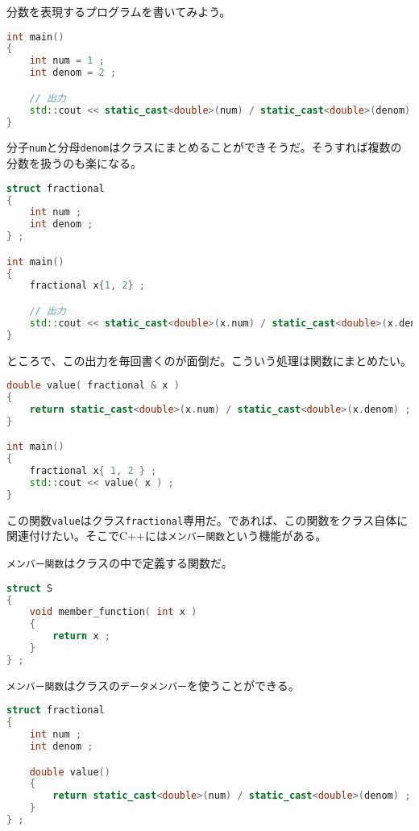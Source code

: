 
分数を表現するプログラムを書いてみよう。

\begin{lstlisting}[language={C++}]
int main()
{
    int num = 1 ;
    int denom = 2 ;

    // 出力
    std::cout << static_cast<double>(num) / static_cast<double>(denom) ;
}
\end{lstlisting}

分子\texttt{num}と分母\texttt{denom}はクラスにまとめることができそうだ。そうすれば複数の分数を扱うのも楽になる。

\begin{lstlisting}[language={C++}]
struct fractional
{
    int num ;
    int denom ;
} ;

int main()
{
    fractional x{1, 2} ;

    // 出力
    std::cout << static_cast<double>(x.num) / static_cast<double>(x.denom) ;
}
\end{lstlisting}

ところで、この出力を毎回書くのが面倒だ。こういう処理は関数にまとめたい。

\begin{lstlisting}[language={C++}]
double value( fractional & x )
{
    return static_cast<double>(x.num) / static_cast<double>(x.denom) ;
}

int main()
{
    fractional x{ 1, 2 } ;
    std::cout << value( x ) ;
}
\end{lstlisting}

この関数\texttt{value}はクラス\texttt{fractional}専用だ。であれば、この関数をクラス自体に関連付けたい。そこでC++には\texttt{メンバー関数}という機能がある。

\texttt{メンバー関数}はクラスの中で定義する関数だ。

\begin{lstlisting}[language={C++}]
struct S
{
    void member_function( int x )
    {
        return x ;
    }
} ;
\end{lstlisting}

\ifTombow\pagebreak\fi
\texttt{メンバー関数}はクラスの\texttt{データメンバー}を使うことができる。

\begin{lstlisting}[language={C++}]
struct fractional
{
    int num ;
    int denom ;

    double value()
    {
        return static_cast<double>(num) / static_cast<double>(denom) ;
    }
} ;
\end{lstlisting}

